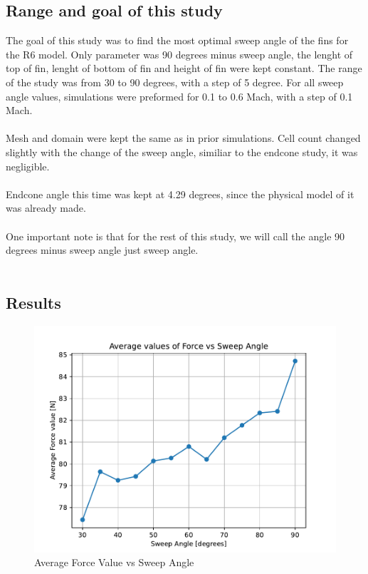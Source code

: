 \documentclass{article}
\begin{document}
\subsection{Range and goal of this study}
The goal of this study was to find the most optimal sweep angle of the fins for the R6 model. 
Only parameter was 90 degrees minus sweep angle, the lenght of top of fin, lenght of bottom of fin and height of 
fin were kept constant. The range of the study was from 30 to 90 degrees, with a step of 5 degree. 
For all sweep angle values, simulations were preformed for 0.1 to 0.6 Mach, with a step of 0.1 Mach.\\\\
Mesh and domain were kept the same as in prior simulations. Cell count changed slightly with the 
change of the sweep angle, similiar to the endcone study, it was negligible.\\\\
Endcone angle this time was kept at 4.29 degrees, since the physical model of it was already made.\\\\
One important note is that for the rest of this study, we will call the angle 90 degrees minus sweep 
angle just sweep angle.\\\\


\subsection{Results}
\begin{figure}[H]
    \centering
    \includegraphics[width=1\textwidth]{../data/R6-Parametric-Fins/ForceVsSweepAngle.pdf}
    \caption{Average Force Value vs Sweep Angle}
    \label{fig:ForceVsSweepAngle}
\end{figure}
\end{document}
